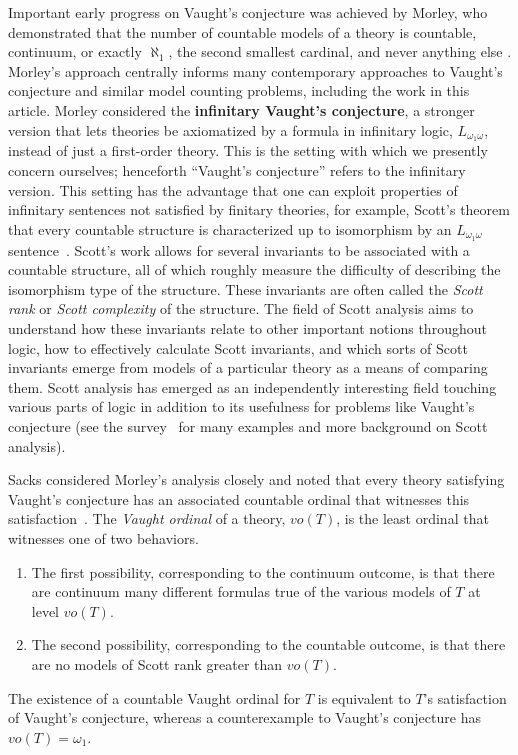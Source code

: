 \documentclass{amsart}
\renewcommand{\-}{\text{-}}
\begin{document}
Important early progress on Vaught's conjecture was achieved by Morley, who demonstrated that the number of countable models of a theory is countable, continuum, or exactly $\aleph_1$, the second smallest cardinal, and never anything else \cite{Mor70}.
Morley's approach centrally informs many contemporary approaches to Vaught's conjecture and similar model counting problems, including the work in this article.
Morley considered the \textbf{infinitary Vaught's conjecture}, a stronger version that lets theories be axiomatized by a formula in infinitary logic, $L_{\omega_1\omega}$, instead of just a first-order theory.
This is the setting with which we presently concern ourselves; henceforth ``Vaught's conjecture'' refers to the infinitary version.
This setting has the advantage that one can exploit properties of infinitary sentences not satisfied by finitary theories, for example, Scott's theorem that every countable structure is characterized up to isomorphism by an $L_{\omega_1\omega}$ sentence~\cite{Sco65}.
Scott's work allows for several invariants to be associated with a countable structure, all of which roughly measure the difficulty of describing the isomorphism type of the structure.
These invariants are often called the \emph{Scott rank} or \emph{Scott complexity} of the structure.
The field of Scott analysis aims to understand how these invariants relate to other important notions throughout logic, how to effectively calculate Scott invariants, and which sorts of Scott invariants emerge from models of a particular theory as a means of comparing them.
Scott analysis has emerged as an independently interesting field touching various parts of logic in addition to its usefulness for problems like Vaught's conjecture (see the survey~\cite{HT22} for many examples and more background on Scott analysis).

Sacks considered Morley's analysis closely and noted that every theory satisfying Vaught's conjecture has an associated countable ordinal that witnesses this satisfaction~\cite{Sac07}.
The \emph{Vaught ordinal} of a theory, $vo(T)$, is the least ordinal that witnesses one of two behaviors.
\begin{enumerate}
 \tightlist
 \item The first possibility, corresponding to the continuum outcome, is that there are continuum many different formulas true of the various models of $T$ at level $vo(T)$.
 \item The second possibility, corresponding to the countable outcome, is that there are no models of Scott rank greater than $vo(T)$.
\end{enumerate}
The existence of a countable Vaught ordinal for $T$ is equivalent to $T$'s satisfaction of Vaught's conjecture, whereas a counterexample to Vaught's conjecture has $vo(T)=\omega_1$.
\end{document}
